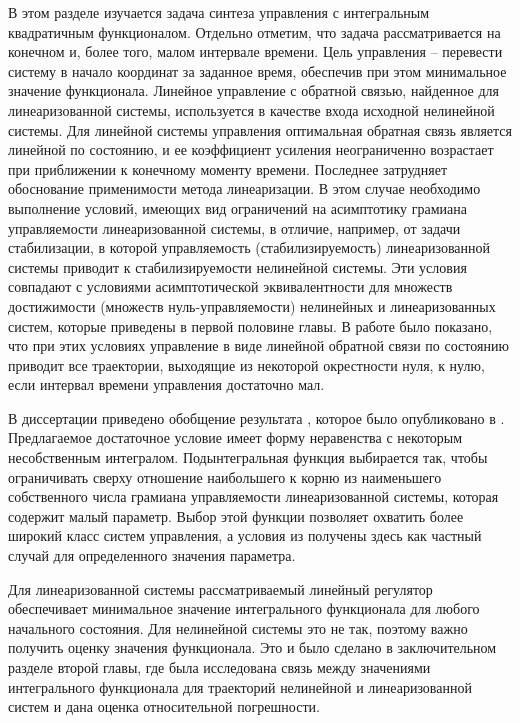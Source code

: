 \documentclass[../main.tex]{subfiles}
\begin{document}
В этом разделе изучается задача синтеза управления с интегральным квадратичным функционалом. 
Отдельно отметим, что задача рассматривается на конечном и, более того, малом интервале времени. 
Цель управления -- перевести систему в начало координат за заданное время, обеспечив при этом минимальное значение функционала. 
Линейное управление с обратной связью, найденное для линеаризованной системы, используется в качестве входа исходной нелинейной системы. 
Для линейной системы управления оптимальная обратная связь является линейной по состоянию, и ее коэффициент усиления неограниченно возрастает при приближении к конечному моменту времени. 
Последнее затрудняет обоснование применимости метода линеаризации. 
В этом случае необходимо выполнение условий, имеющих вид ограничений на асимптотику грамиана управляемости линеаризованной системы, в отличие, например, от задачи стабилизации, в которой управляемость (стабилизируемость) линеаризованной системы приводит к стабилизируемости нелинейной системы. 
Эти условия совпадают с условиями асимптотической эквивалентности для множеств достижимости (множеств нуль-управляемости) нелинейных и линеаризованных систем, которые приведены в первой половине главы. 
В работе \cite{GusevOsipov} было показано, что при этих условиях управление в виде линейной обратной связи по состоянию приводит все траектории, выходящие из некоторой окрестности нуля, к нулю, если интервал времени управления достаточно мал. 

В  диссертации приведено обобщение результата \cite{GusevOsipov}, которое было опубликовано в \cite{GusevOsipovMotor}. 
Предлагаемое достаточное условие имеет форму неравенства с некоторым несобственным интегралом.
Подынтегральная функция выбирается так, чтобы ограничивать сверху отношение наибольшего к корню из наименьшего собственного числа грамиана управляемости линеаризованной системы, которая содержит малый параметр. 
Выбор этой функции позволяет охватить более широкий класс систем управления, а условия из \cite{GusevOsipov} получены здесь как частный случай для определенного значения параметра.

Для линеаризованной системы рассматриваемый линейный регулятор обеспечивает минимальное значение интегрального функционала для любого начального состояния. 
Для нелинейной системы это не так, поэтому важно получить оценку значения функционала. 
Это и было сделано в заключительном разделе второй главы, где была исследована связь между значениями интегрального функционала для траекторий нелинейной и линеаризованной систем и дана оценка относительной погрешности. 
\end{document}
